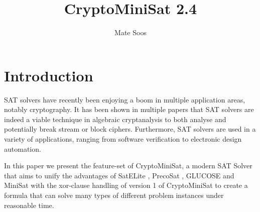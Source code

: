 \documentclass[final]{ieee}
\begin{document}

\title{CryptoMiniSat 2.4}
\author{Mate Soos}

\maketitle
\thispagestyle{empty}
\pagestyle{empty}


\section{Introduction}
SAT solvers have recently been enjoying a boom in multiple application areas, notably cryptography. It has been shown in multiple papers \cite{DBLP:conf/ima/CourtoisB07,BiviumWithSATsolvers,DBLP:conf/sat/SoosNC09} that SAT solvers are indeed a viable technique in algebraic cryptanalysis to both analyse and potentially break stream or block ciphers. Furthermore, SAT solvers are used in a variety of applications, ranging from software verification to electronic design automation.

In this paper we present the feature-set of CryptoMiniSat, a modern SAT Solver that aims to unify the advantages of SatELite \cite{DBLP:conf/sat/EenB05}, PrecoSat \cite{precosat}, GLUCOSE \cite{glucose} and MiniSat \cite{EenS03MiniSat} with the xor-clause handling of version 1 of CryptoMiniSat \cite{DBLP:conf/sat/SoosNC09} to create a formula that can solve many types of different problem instances under reasonable time.

\end{document}
